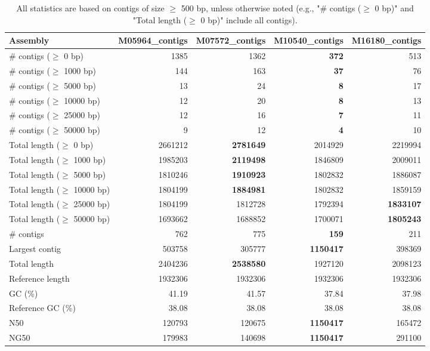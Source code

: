 \documentclass[12pt,a4paper]{article}
\begin{document}
\begin{table}[ht]
\begin{center}
\caption{All statistics are based on contigs of size $\geq$ 500 bp, unless otherwise noted (e.g., "\# contigs ($\geq$ 0 bp)" and "Total length ($\geq$ 0 bp)" include all contigs).}
\begin{tabular}{|l*{4}{|r}|}
\hline
Assembly & M05964\_contigs & M07572\_contigs & M10540\_contigs & M16180\_contigs \\ \hline
\# contigs ($\geq$ 0 bp) & 1385 & 1362 & {\bf 372} & 513 \\ \hline
\# contigs ($\geq$ 1000 bp) & 144 & 163 & {\bf 37} & 76 \\ \hline
\# contigs ($\geq$ 5000 bp) & 13 & 24 & {\bf 8} & 17 \\ \hline
\# contigs ($\geq$ 10000 bp) & 12 & 20 & {\bf 8} & 13 \\ \hline
\# contigs ($\geq$ 25000 bp) & 12 & 16 & {\bf 7} & 11 \\ \hline
\# contigs ($\geq$ 50000 bp) & 9 & 12 & {\bf 4} & 10 \\ \hline
Total length ($\geq$ 0 bp) & 2661212 & {\bf 2781649} & 2014929 & 2219994 \\ \hline
Total length ($\geq$ 1000 bp) & 1985203 & {\bf 2119498} & 1846809 & 2009011 \\ \hline
Total length ($\geq$ 5000 bp) & 1810246 & {\bf 1910923} & 1802832 & 1886087 \\ \hline
Total length ($\geq$ 10000 bp) & 1804199 & {\bf 1884981} & 1802832 & 1859159 \\ \hline
Total length ($\geq$ 25000 bp) & 1804199 & 1812728 & 1792394 & {\bf 1833107} \\ \hline
Total length ($\geq$ 50000 bp) & 1693662 & 1688852 & 1700071 & {\bf 1805243} \\ \hline
\# contigs & 762 & 775 & {\bf 159} & 211 \\ \hline
Largest contig & 503758 & 305777 & {\bf 1150417} & 398369 \\ \hline
Total length & 2404236 & {\bf 2538580} & 1927120 & 2098123 \\ \hline
Reference length & 1932306 & 1932306 & 1932306 & 1932306 \\ \hline
GC (\%) & 41.19 & 41.57 & 37.84 & 37.98 \\ \hline
Reference GC (\%) & 38.08 & 38.08 & 38.08 & 38.08 \\ \hline
N50 & 120793 & 120675 & {\bf 1150417} & 165472 \\ \hline
NG50 & 179983 & 140698 & {\bf 1150417} & 291100 \\ \hline

\end{tabular}
\end{center}
\end{table}
\end{document}
